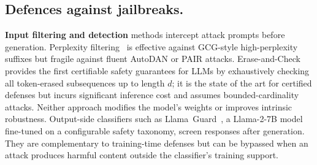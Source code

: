 \documentclass{article}
\begin{document}
\subsection{Defences against jailbreaks.}
\label{sec:defences-against-jailbreaks}
\textbf{Input filtering and detection} methods intercept attack prompts before generation. Perplexity filtering~\cite{jain2023baseline} is effective against GCG-style high-perplexity suffixes but fragile against fluent AutoDAN or PAIR attacks. Erase-and-Check~\cite{kumar2023erase} provides the first certifiable safety guarantees for LLMs by exhaustively checking all token-erased subsequences up to length $d$; it is the state of the art for certified defenses but incurs significant inference cost and assumes bounded-cardinality attacks. Neither approach modifies the model's weights or improves intrinsic robustness. Output-side classifiers such as Llama~Guard~\cite{inan2023llamaguard}, a Llama-2-7B model fine-tuned on a configurable safety taxonomy, screen responses after generation. They are complementary to training-time defenses but can be bypassed when an attack produces harmful content outside the classifier's training support. 
\end{document}
